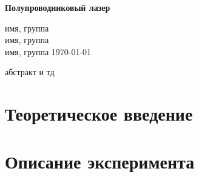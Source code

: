 \documentclass[a4paper,12pt]{article} %
\begin{document}
\begin{center}   
	\Large{\textbf{Полупроводниковый лазер}}\\
    \normalsize
    \begin{flushright}
    имя, группа \\
    имя, группа \\
    имя, группа
    \today
    \end{flushright}
\end{center}

\begin{center}
абстракт и тд
\end{center}

\tableofcontents

\newpage
\section{Теоретическое введение}
\section{Описание эксперимента}
\end{document}
